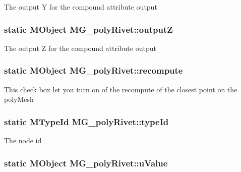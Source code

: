 The output Y for the compound attribute output \hypertarget{class_m_g__poly_rivet_a7c80d2819ac2a76ca9feb872c4e3598d}{
\subsubsection[{output\-Z}]{\setlength{\rightskip}{0pt plus 5cm}static M\-Object M\-G\-\_\-poly\-Rivet\-::output\-Z\hspace{0.3cm}{\ttfamily [static]}}}\label{class_m_g__poly_rivet_a7c80d2819ac2a76ca9feb872c4e3598d}
The output Z for the compound attribute output \hypertarget{class_m_g__poly_rivet_af74d6fe431dadcc1806a072cf97fba97}{
\subsubsection[{recompute}]{\setlength{\rightskip}{0pt plus 5cm}static M\-Object M\-G\-\_\-poly\-Rivet\-::recompute\hspace{0.3cm}{\ttfamily [static]}}}\label{class_m_g__poly_rivet_af74d6fe431dadcc1806a072cf97fba97}
This check box let you turn on of the recompute of the closest point on the poly\-Mesh \hypertarget{class_m_g__poly_rivet_ab40d934bc8164246ba36c1e2c96eaa7c}{
\subsubsection[{type\-Id}]{\setlength{\rightskip}{0pt plus 5cm}static M\-Type\-Id M\-G\-\_\-poly\-Rivet\-::type\-Id\hspace{0.3cm}{\ttfamily [static]}}}\label{class_m_g__poly_rivet_ab40d934bc8164246ba36c1e2c96eaa7c}
The node id \hypertarget{class_m_g__poly_rivet_a04be4b6c8cf58fe4b45bc20edbd52d38}{
\subsubsection[{u\-Value}]{\setlength{\rightskip}{0pt plus 5cm}static M\-Object M\-G\-\_\-poly\-Rivet\-::u\-Value\hspace{0.3cm}{\ttfamily [static]}}}\label{class_m_g__poly_rivet_a04be4b6c8cf58fe4b45bc20edbd52d38}
